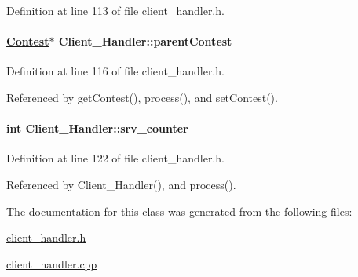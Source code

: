 Definition at line 113 of file client\_\-handler.h.\hypertarget{classClient__Handler_Client__Handlern1}{
\paragraph[parentContest]{\setlength{\rightskip}{0pt plus 5cm}\hyperlink{classContest}{Contest}$\ast$ Client\_\-Handler::parent\-Contest}\hfill}
\label{classClient__Handler_Client__Handlern1}




Definition at line 116 of file client\_\-handler.h.

Referenced by get\-Contest(), process(), and set\-Contest().\hypertarget{classClient__Handler_Client__Handlern3}{
\paragraph[srv\_\-counter]{\setlength{\rightskip}{0pt plus 5cm}int Client\_\-Handler::srv\_\-counter}\hfill}
\label{classClient__Handler_Client__Handlern3}




Definition at line 122 of file client\_\-handler.h.

Referenced by Client\_\-Handler(), and process().

The documentation for this class was generated from the following files:\begin{CompactItemize}
\item 
\hyperlink{client__handler_8h}{client\_\-handler.h}\item 
\hyperlink{client__handler_8cpp}{client\_\-handler.cpp}\end{CompactItemize}
